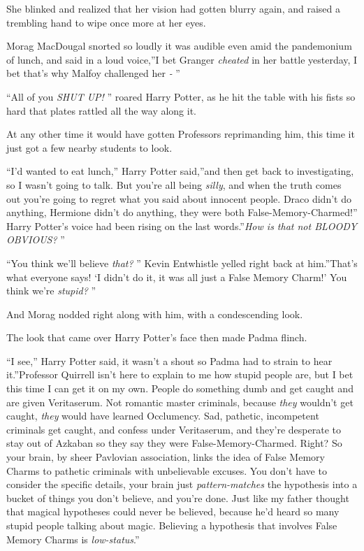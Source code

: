 She blinked and realized that her vision had gotten blurry again, and
raised a trembling hand to wipe once more at her eyes.

Morag MacDougal snorted so loudly it was audible even amid the
pandemonium of lunch, and said in a loud voice,''I bet Granger
\emph{cheated} in her battle yesterday, I bet that's why Malfoy
challenged her \emph{-} ''

``All of you \emph{SHUT UP!} '' roared Harry Potter, as he hit the table
with his fists so hard that plates rattled all the way along it.

At any other time it would have gotten Professors reprimanding him, this
time it just got a few nearby students to look.

``I'd wanted to eat lunch,'' Harry Potter said,''and then get back to
investigating, so I wasn't going to talk. But you're all being
\emph{silly}, and when the truth comes out you're going to regret what
you said about innocent people. Draco didn't do anything, Hermione
didn't do anything, they were both False-Memory-Charmed!'' Harry
Potter's voice had been rising on the last words.''\emph{How is that not
BLOODY OBVIOUS?} ''

``You think we'll believe \emph{that?} '' Kevin Entwhistle yelled right
back at him.''That's what everyone says! `I didn't do it, it was all
just a False Memory Charm!' You think we're \emph{stupid?} ''

And Morag nodded right along with him, with a condescending look.

The look that came over Harry Potter's face then made Padma flinch.

``I see,'' Harry Potter said, it wasn't a shout so Padma had to strain
to hear it.''Professor Quirrell isn't here to explain to me how stupid
people are, but I bet this time I can get it on my own. People do
something dumb and get caught and are given Veritaserum. Not romantic
master criminals, because \emph{they} wouldn't get caught, \emph{they}
would have learned Occlumency. Sad, pathetic, incompetent criminals get
caught, and confess under Veritaserum, and they're desperate to stay out
of Azkaban so they say they were False-Memory-Charmed. Right? So your
brain, by sheer Pavlovian association, links the idea of False Memory
Charms to pathetic criminals with unbelievable excuses. You don't have
to consider the specific details, your brain just \emph{pattern-matches}
the hypothesis into a bucket of things you don't believe, and you're
done. Just like my father thought that magical hypotheses could never be
believed, because he'd heard so many stupid people talking about magic.
Believing a hypothesis that involves False Memory Charms is
\emph{low-status}.''

